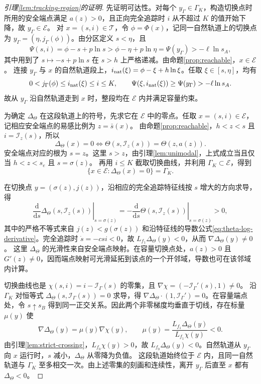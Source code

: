 \documentclass[lang=cn,a4paper,newtx]{elegantpaper}
\theoremstyle{plain}
\theoremstyle{definition}
\begin{document}
\begin{proof}[引理\ref{lem:tracking-region}的证明]
先证明可达性。对每个 $y_\Gamma\in\Gamma_K$，构造切换点时所用的安全端点满足 $a(z)>0$，且正向完全追踪时 $i$ 从不超过 $K$ 的值开始下降，故 $y_\Gamma\in\mathcal E$。
对 $x=(s,i)\in\mathcal T$，令 $\phi=\Phi(x)$，记同一自然轨道上的切换点为 $y_\Gamma=(\eta,j_\Gamma(\phi))$。由分区定义 $s<\eta$，且
\[
\Psi(s,i)=\phi-s+p\ln s>\phi-\eta+p\ln\eta=\Psi(y_\Gamma)>-\ell\ln s_A,
\]
其中用到了 $s\mapsto-s+p\ln s$ 在 $s>h$ 上严格递减。由命题\ref{prop:reachable}，$x\in\mathcal E$。
连接 $y_\Gamma$ 与 $x$ 的自然轨道段上，$i_{\rm nat}(\xi)=\phi-\xi+h\ln\xi$。任取 $\xi\in[s,\eta]$，均有
\[
0<j_\Gamma(\phi)\le i_{\rm nat}(\xi)\le i\le K,\qquad
\Psi(\xi,i_{\rm nat}(\xi))\ge\Psi(y_\Gamma)>-\ell\ln s_A.
\]
故从 $y_\Gamma$ 沿自然轨道走到 $x$ 时，整段均在 $\mathcal E$ 内并满足容量约束。

为确定 $\Delta_\Theta$ 在这段轨道上的符号，先求它在 $\mathcal E$ 中的零点。任取 $x=(s,i)\in\mathcal E$，记相应安全端点的易感比例为 $z=\bar s(x)$。
由命题\ref{prop:reachable}，$h<z<s$ 且 $i=\mathcal I_z(s)$，所以
\[
\Delta_\Theta(x)=0
\iff \Theta(s,\mathcal I_z(s))=\Theta(z,a(z)).
\]
安全端点对应的根为 $s=z$。这里 $s>z$，由引理\ref{lem:unimodal}，上式成立当且仅当 $h<z<s_e$ 且 $s=\sigma(z)$。
再用 $i\le K$ 截取切换曲线，并利用 $\Gamma_K\subset\mathcal E$，得到
\[
\{x\in\mathcal E:\Delta_\Theta(x)=0\}=\Gamma_K.
\]

在切换点 $y=(\sigma(z),j(z))$，沿相应的完全追踪特征线按 $s$ 增大的方向求导，得
\[
\left.\frac{\mathrm d}{\mathrm d s}\Delta_\Theta(s,\mathcal I_z(s))\right|_{s=\sigma(z)}
=-\left.\frac{\mathrm d}{\mathrm d s}\Theta(s,\mathcal I_z(s))\right|_{s=\sigma(z)}>0,
\]
其中的严格不等式来自 $j(z)<g(\sigma(z))$ 和沿特征线的导数公式\eqref{eq:theta-log-derivative}。完全追踪时 $\dot s=-csi<0$，故 $L_{f_1}\Delta_\Theta(y)<0$，从而 $\nabla \Delta_\Theta(y)\ne0$。
这里 $\Delta_\Theta$ 的光滑性来自安全端点映射。在容量切换点处，$a(z)>0$ 且 $G'(z)\ne0$，因而端点映射可光滑延拓到该点的一个开邻域，导数也可在该邻域内计算。

切换曲线也是 $\chi(s,i)=i-\mathcal I_\Gamma(s)$ 的零集，且
$\nabla\chi=(-\mathcal I_\Gamma'(s),1)\ne0$。
沿 $\Gamma_K$ 对恒等式 $\Delta_\Theta(s,\mathcal I_\Gamma(s))=0$ 求导，得 $\nabla \Delta_\Theta\cdot(1,\mathcal I_\Gamma')=0$。在容量端点处，令 $s\uparrow s_B$ 得到同一正交关系。因此两个非零梯度均垂直于切线，存在标量 $\mu(y)$ 使
\[
\nabla \Delta_\Theta(y)=\mu(y)\nabla\chi(y),\qquad
\mu(y)=\frac{L_{f_1}\Delta_\Theta(y)}{L_{f_1}\chi(y)}<0.
\]
由引理\ref{lem:strict-crossing}，$L_{f_0}\chi(y)>0$，故 $L_{f_0}\Delta_\Theta(y)<0$。自然轨道从 $y_\Gamma$ 向 $x$ 运行时，$s$ 减小，$\Delta_\Theta$ 从零降为负值。
这段轨道始终位于 $\mathcal E$ 内，且同一自然轨道与 $\Gamma_K$ 至多相交一次。由上述零集的刻画和连续性，离开 $y_\Gamma$ 后直至 $x$ 都有 $\Delta_\Theta<0$。


\end{proof}
\end{document}
